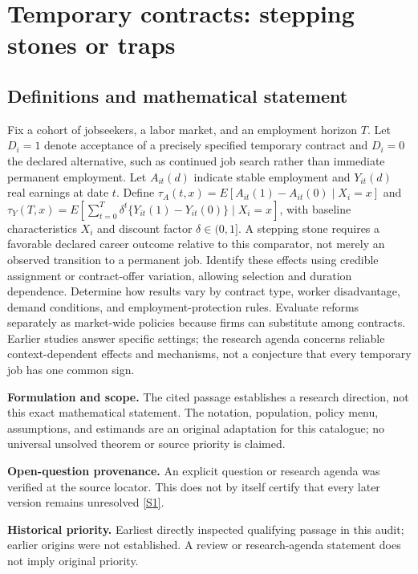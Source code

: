 \documentclass[11pt]{article}
\newcommand{\sref}[2]{\hyperlink{source:#1:#2}{[S#2]}}
\begin{document}
\section*{Temporary contracts: stepping stones or traps}\label{30007641}
\subsection{Definitions and mathematical statement}
Fix a cohort of jobseekers, a labor market, and an employment horizon \(T\). Let \(D_i=1\) denote acceptance of a precisely specified temporary contract and \(D_i=0\) the declared alternative, such as continued job search rather than immediate permanent employment. Let \(A_{it}(d)\) indicate stable employment and \(Y_{it}(d)\) real earnings at date \(t\). Define \(\tau_A(t,x)=E[A_{it}(1)-A_{it}(0)\mid X_i=x]\) and \(\tau_Y(T,x)=E[\sum_{t=0}^{T}\delta^t\{Y_{it}(1)-Y_{it}(0)\}\mid X_i=x]\), with baseline characteristics \(X_i\) and discount factor \(\delta\in(0,1]\). A stepping stone requires a favorable declared career outcome relative to this comparator, not merely an observed transition to a permanent job. Identify these effects using credible assignment or contract-offer variation, allowing selection and duration dependence. Determine how results vary by contract type, worker disadvantage, demand conditions, and employment-protection rules. Evaluate reforms separately as market-wide policies because firms can substitute among contracts. Earlier studies answer specific settings; the research agenda concerns reliable context-dependent effects and mechanisms, not a conjecture that every temporary job has one common sign.

\par\textbf{Formulation and scope.} The cited passage establishes a research direction, not this exact mathematical statement. The notation, population, policy menu, assumptions, and estimands are an original adaptation for this catalogue; no universal unsolved theorem or source priority is claimed.

\par\textbf{Open-question provenance.} An explicit question or research agenda was verified at the source locator. This does not by itself certify that every later version remains unresolved \sref{30007641}{1}.

\par\textbf{Historical priority.} Earliest directly inspected qualifying passage in this audit; earlier origins were not established. A review or research-agenda statement does not imply original priority.
\end{document}
